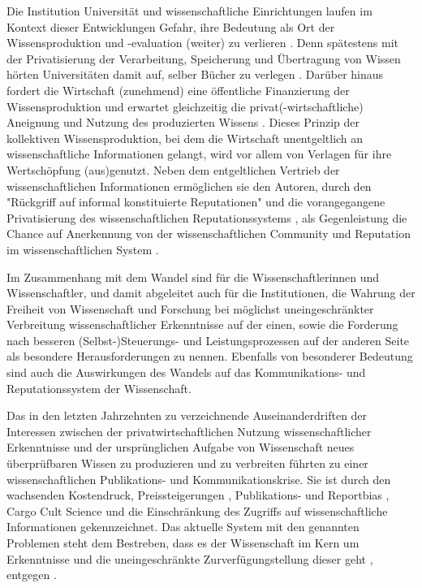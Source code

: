 Die Institution Universität und wissenschaftliche Einrichtungen laufen im Kontext dieser Entwicklungen Gefahr, ihre Bedeutung als Ort der Wissensproduktion und -evaluation (weiter) zu verlieren \cite[:343]{Kruecken_2001}. Denn spätestens mit der Privatisierung der Verarbeitung, Speicherung und Übertragung von Wissen hörten Universitäten damit auf, selber Bücher zu verlegen \cite{cite:0}. Darüber hinaus fordert die Wirtschaft (zunehmend) eine öffentliche Finanzierung der Wissensproduktion und erwartet gleichzeitig die privat(-wirtschaftliche) Aneignung und Nutzung des produzierten Wissens \cite{cite:2}. Dieses Prinzip der kollektiven Wissensproduktion, bei dem die Wirtschaft unentgeltlich an wissenschaftliche Informationen gelangt, wird vor allem von Verlagen für ihre Wertschöpfung (aus)genutzt. Neben dem entgeltlichen Vertrieb der wissenschaftlichen Informationen ermöglichen sie den Autoren, durch den "Rückgriff auf informal konstituierte Reputationen" \cite{luhmann_1970_selbststeuerung} und die vorangegangene Privatisierung des wissenschaftlichen Reputationssystems \cite{suchen}, als Gegenleistung die Chance auf Anerkennung von der wissenschaftlichen Community und Reputation im wissenschaftlichen System \cite{cite:21a}.

Im Zusammenhang mit dem Wandel sind für die Wissenschaftlerinnen und Wissenschaftler, und damit abgeleitet auch für die Institutionen, die Wahrung der Freiheit von Wissenschaft und Forschung bei möglichst uneingeschränkter Verbreitung wissenschaftlicher Erkenntnisse \cite{hagner_2015_sache_buches} \cite{bbaw_publizieren_2015} auf der einen, sowie die Forderung nach besseren (Selbst-)Steuerungs- und Leistungsprozessen \cite{Adler_2009} \cite{gibbons_1994} auf der anderen Seite als besondere Herausforderungen zu nennen. Ebenfalls von besonderer Bedeutung sind auch die Auswirkungen des Wandels auf das Kommunikations- und Reputationssystem der Wissenschaft.

Das in den letzten Jahrzehnten zu verzeichnende Auseinanderdriften der Interessen zwischen der privatwirtschaftlichen Nutzung wissenschaftlicher Erkenntnisse und der ursprünglichen Aufgabe von Wissenschaft neues überprüfbaren Wissen zu produzieren und zu verbreiten führten zu einer wissenschaftlichen Publikations- und Kommunikationskrise. Sie ist durch den wachsenden Kostendruck, Preissteigerungen \cite{lewis_2015_future}, Publikations- \cite{Egger_1997} \cite{Fanelli_2012} \cite{Beverungen_2012} \cite{Brembs_20013} und Reportbias \cite{Chan_2008} \cite{Dickersin_2011}, Cargo Cult Science \cite{Feynman_1974} und die Einschränkung des Zugriffs auf wissenschaftliche Informationen \cite{Hess_2006} gekennzeichnet. Das aktuelle System mit den genannten Problemen steht dem Bestreben, dass es der Wissenschaft im Kern um Erkenntnisse und die uneingeschränkte Zurverfügungstellung dieser geht \cite{hanekop_2006}, entgegen \cite{offhaus_2012_institutionelle_repos}.

